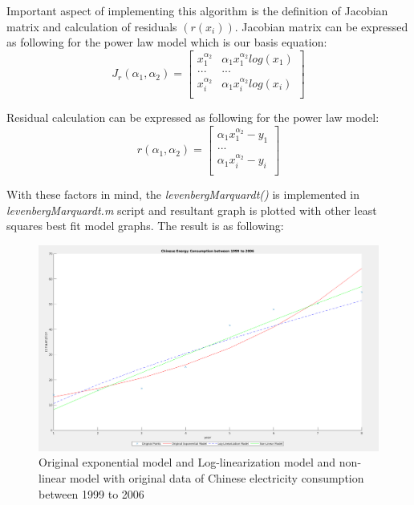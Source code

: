 \documentclass[unicode,11pt,a4paper,oneside,numbers=endperiod,openany]{scrartcl}
\begin{document}
\begin{enumerate}[label=(\alph*)]
Important aspect of implementing this algorithm is the definition of Jacobian matrix and calculation of residuals ${(r(x_i))}$. Jacobian matrix can be expressed as following for the power law model which is our basis equation: \\

\begin{equation}
 J_r(\alpha_1, \alpha_2) = \begin{bmatrix}
            x_1^{\alpha_2} & \alpha_1x_1^{\alpha_2}log(x_1) \\
            ... & ... \\
            x_i^{\alpha_2} & \alpha_1x_i^{\alpha_2}log(x_i) \\
       \end{bmatrix}
\end{equation}

\vspace{5px}

Residual calculation can be expressed as following for the power law model: \\

\begin{equation}
 r(\alpha_1, \alpha_2) = \begin{bmatrix}
            \alpha_1 x_1^{\alpha_2} - y_1\\
            ... \\
            \alpha_1 x_i^{\alpha_2} - y_i\\
       \end{bmatrix}
\end{equation}

With these factors in mind, the \textit{levenbergMarquardt()} is implemented in \textit{levenbergMarquardt.m} script and resultant graph is plotted with other least squares best fit model graphs. The result is as following: \\

 \begin{figure}[h!]
    \begin{minipage}[c]{1\linewidth}
        \centering
        \includegraphics[width=0.9\linewidth]{./figures/ex4b.png}
    \end{minipage}
  \caption{Original exponential model and Log-linearization model and non-linear model with original data of Chinese electricity consumption between 1999 to 2006}
\end{figure}


\end{enumerate}
\end{document}
